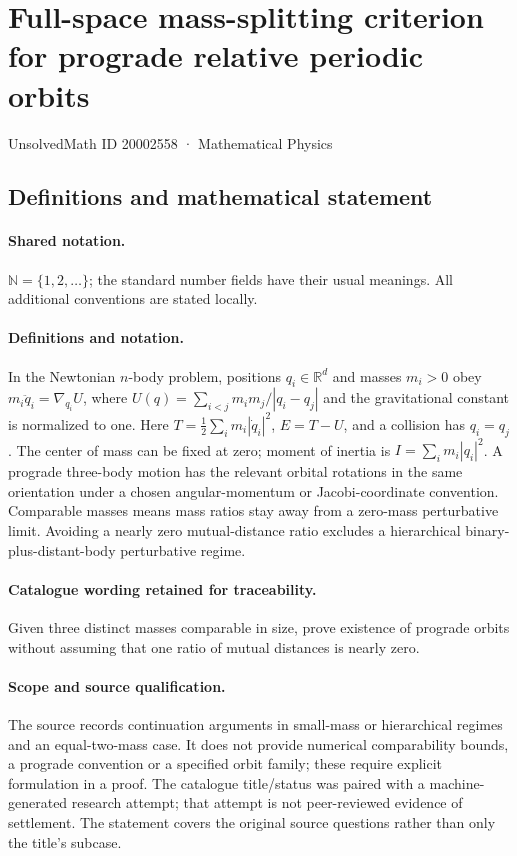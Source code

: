 \documentclass[11pt]{article}
\begin{document}
\setcounter{section}{20002557}
\section{Full-space mass-splitting criterion for prograde relative periodic orbits}\label{20002558}
{\small UnsolvedMath ID 20002558 · Mathematical Physics}
\subsection{Definitions and mathematical statement}

\paragraph{Shared notation.}$\mathbb N=\{1,2,\ldots\}$; the standard number fields have their usual meanings. All additional conventions are stated locally.


\paragraph{Definitions and notation.}In the Newtonian $n$-body problem, positions $q_i\in\mathbb R^d$ and masses $m_i>0$ obey $m_i\ddot q_i=\nabla_{q_i}U$, where $U(q)=\sum_{i<j}m_im_j/|q_i-q_j|$ and the gravitational constant is normalized to one. Here $T=\tfrac12\sum_i m_i|\dot q_i|^2$, $E=T-U$, and a collision has $q_i=q_j$. The center of mass can be fixed at zero; moment of inertia is $I=\sum_i m_i|q_i|^2$. A prograde three-body motion has the relevant orbital rotations in the same orientation under a chosen angular-momentum or Jacobi-coordinate convention. Comparable masses means mass ratios stay away from a zero-mass perturbative limit. Avoiding a nearly zero mutual-distance ratio excludes a hierarchical binary-plus-distant-body perturbative regime.

\paragraph{Catalogue wording retained for traceability.}
Given three distinct masses comparable in size, prove existence of prograde orbits without assuming that one ratio of mutual distances is nearly zero.
\paragraph{Scope and source qualification.}The source records continuation arguments in small-mass or hierarchical regimes and an equal-two-mass case. It does not provide numerical comparability bounds, a prograde convention or a specified orbit family; these require explicit formulation in a proof. The catalogue title/status was paired with a machine-generated research attempt; that attempt is not peer-reviewed evidence of settlement. The statement covers the original source questions rather than only the title’s subcase.
\end{document}
